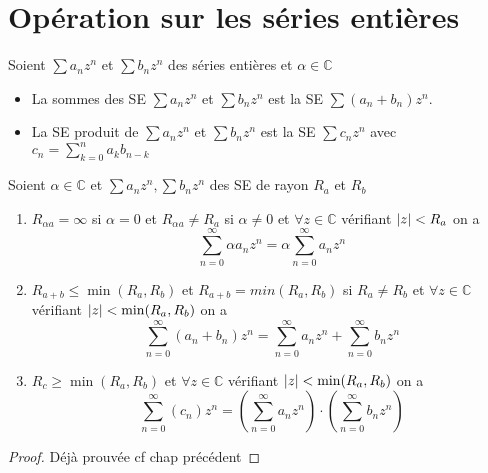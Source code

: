 \documentclass[11pt,hidelinks]{book}
\theoremstyle{mytheoremstyle}
\theoremstyle{mytheoremstyle}
\theoremstyle{mytheoremstyle}
\theoremstyle{mytheoremstyle}
\theoremstyle{mytheoremstyle}
\theoremstyle{mytheoremstyle}
\theoremstyle{mytheoremstyle}
\theoremstyle{mytheoremstyle}
\theoremstyle{myproblemstyle}
\def\mbb#1{\mathbb{#1}}
\def\bC{\mbb{C}}
\def\se{\sum a_n z^n}
\def\seb#1{\sum #1_n z^n}
\newcommand{\parenth}[1]{\left(#1\right)}
\begin{document}
\section{Opération sur les séries entières}
\begin{definition}
    Soient $\se$ et $\seb{b}$ des séries entières et $\alpha \in \bC$
    \begin{itemize}[label=$\circ$]
    \item La sommes des SE $\se$ et $\seb{b}$ est la SE $\sum (a_n + b_n) z^n$. 
    \item La SE produit de $\se$ et $\seb{b}$ est la SE $\seb{c}$ avec $c_n = \sum_{k=0}^n a_k b_{n-k}$
    \end{itemize}
\end{definition}
\begin{adjustwidth}{-2em}{-1em}
    \begin{prop}
        Soient $\alpha \in \bC$ et $\se, \seb{b}$ des SE de rayon $R_a$ et $R_b$
        \newline 
        \begin{enumerate}
            \item $R_{\alpha a} = \infty$ si $\alpha = 0$ et $R_{\alpha a} \not= R_a$ si $\alpha \not= 0$
            et $\forall z \in \bC$ vérifiant $\abs{z} < R_a$ on a 
            \begin{equation*}
                \sum_{n=0}^{\infty} \alpha a_n z^n = \alpha \sum_{n=0}^{\infty} a_n z^n
            \end{equation*}
            \item $R_{a+b} \leq \min(R_a,R_b)$ et $R_{a+b} = min(R_a, R_b)$ si $R_a \not= R_b$
            et $\forall z \in \bC$ vérifiant $\abs{z} < \min(R_a,R_b)$ on a 
            \begin{equation*}
                \sum_{n=0}^{\infty} (a_n+b_n) z^n = \sum_{n=0}^{\infty} a_n z^n + \sum_{n=0}^{\infty} b_n z^n
            \end{equation*}
            \item $R_{c} \geq \min(R_a,R_b)$ 
            et $\forall z \in \bC$ vérifiant $\abs{z} < \min(R_a,R_b)$ on a 
            \begin{equation*}
                \sum_{n=0}^{\infty} (c_n) z^n = \parenth{\sum_{n=0}^{\infty} a_n z^n} \cdot \parenth{\sum_{n=0}^{\infty} b_n z^n}
            \end{equation*}
        \end{enumerate}
        \begin{proof}
            Déjà prouvée cf chap précédent
        \end{proof}
    \end{prop}
\end{adjustwidth}
\end{document}
